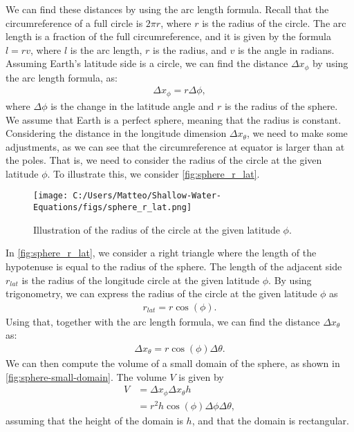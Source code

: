 We can find these distances by using the arc length formula.
Recall that the circumreference of a full circle is $2\pi r$, where $r$ is the radius of the circle.
The arc length is a fraction of the full circumreference, and it is given by the formula $l = r v$, where $l$ is the arc length, $r$ is the radius, and $v$ is the angle in radians.
Assuming Earth's latitude side is a circle, we can find the distance $\Delta x_{\phi}$ by using the arc length formula, as:
\begin{align*}
    \Delta x_{\phi} = r \Delta \phi,
\end{align*}
where $\Delta \phi$ is the change in the latitude angle and $r$ is the radius of the sphere.
We assume that Earth is a perfect sphere, meaning that the radius is constant.
Considering the distance in the longitude dimension $\Delta x_{\theta}$, we need to make some adjustments, as we can see that the circumreference at equator is larger than at the poles.
That is, we need to consider the radius of the circle at the given latitude $\phi$.
To illustrate this, we consider \autoref{fig:sphere_r_lat}.
\begin{figure}[H]
    \centering
    \texttt{[image: C:/Users/Matteo/Shallow-Water-Equations/figs/sphere\_r\_lat.png]}
    \caption{Illustration of the radius of the circle at the given latitude $\phi$.}\label{fig:sphere_r_lat}
\end{figure}
In \autoref{fig:sphere_r_lat}, we consider a right triangle where the length of the hypotenuse is equal to the radius of the sphere.
The length of the adjacent side $r_{lat}$ is the radius of the longitude circle at the given latitude $\phi$.
By using trigonometry, we can express the radius of the circle at the given latitude $\phi$ as
\begin{align*}
    r_{lat} = r \cos(\phi).  
\end{align*}
Using that, together with the arc length formula, we can find the distance $\Delta x_{\theta}$ as:
\begin{align*}
    \Delta x_{\theta} = r \cos(\phi) \Delta \theta.
\end{align*}
We can then compute the volume of a small domain of the sphere, as shown in \autoref{fig:sphere-small-domain}.
The volume $V$ is given by 
\begin{align*}
    V &= \Delta x_{\phi} \Delta x_{\theta} h \\
    &= r^2 h \cos(\phi) \Delta \phi \Delta \theta,
\end{align*}
assuming that the height of the domain is $h$, and that the domain is rectangular.
